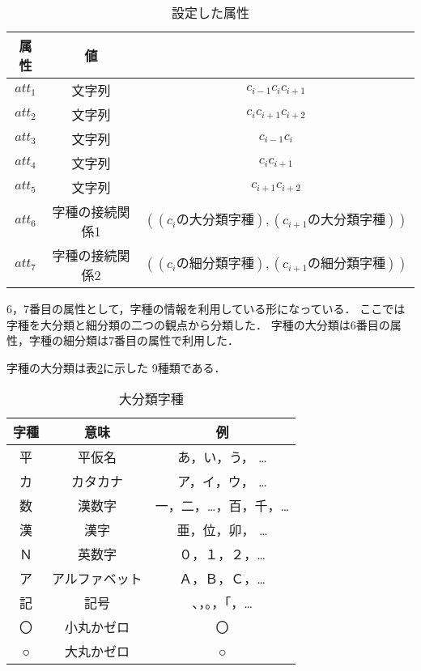 \begin{table}[h]
  \begin{center}
    \leavevmode \small
    \caption{設定した属性}
      \label{attribute}
    \begin{tabular}{|c|cc|} \hline
属性           &     値    &   \\ \hline
\( att_{1} \)  &  文字列 & \( c_{i-1}c_{i}c_{i+1} \)      \\ \hline
\( att_{2} \)  &  文字列 & \( c_{i}c_{i+1}c_{i+2} \)      \\ \hline

\( att_{3} \)  &  文字列 & \( c_{i-1}c_{i} \)          \\ \hline
\( att_{4} \)  &  文字列 & \( c_{i}c_{i+1} \)            \\ \hline
\( att_{5} \)  &  文字列 & \( c_{i+1}c_{i+2} \)           \\ \hline
\( att_{6} \)  &  字種の接続関係1 & \( ((c_{i}の大分類字種), (c_{i+1}の大分類字種)) \)  \\ \hline
\( att_{7} \)  &  字種の接続関係2 & \( ((c_{i}の細分類字種), (c_{i+1}の細分類字種)) \)  \\ \hline
    \end{tabular}
  \end{center}
\end{table}

6，7番目の属性として，字種の情報を利用している形になっている．
ここでは字種を大分類と細分類の二つの観点から分類した．
字種の大分類は6番目の属性，字種の細分類は7番目の属性で利用した．

字種の大分類は\mbox{表\ref{dai-bunrui}}に示した 9種類である．

\newpage

\begin{table}[h]
  \begin{center}
    \leavevmode \small
    \caption{大分類字種}
    \label{dai-bunrui}
    \begin{tabular}{|c|c|c|} \hline
字種  & 意味    & 例 \\ \hline
平    &  平仮名 & あ，い，う， … \\ \hline
カ    & カタカナ   & ア，イ，ウ， … \\ \hline
数    & 漢数字    & 一，二，…，百，千，… \\ \hline
漢    & 漢字      & 亜，位，卯， … \\ \hline
Ｎ    & 英数字    & ０，１，２，… \\ \hline
ア    & アルファベット & Ａ，Ｂ，Ｃ，… \\ \hline
記    & 記号     & 、，。，「，… \\ \hline
〇    & 小丸かゼロ &  〇 \\ \hline
○    & 大丸かゼロ &  ○ \\ \hline
    \end{tabular}
  \end{center}
\end{table}


